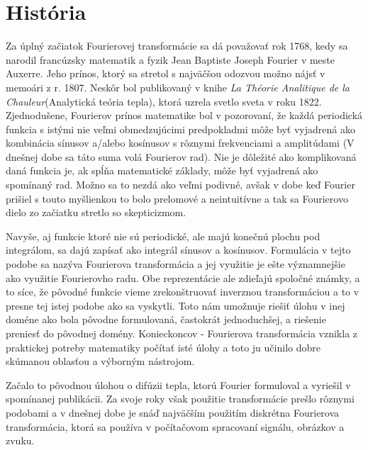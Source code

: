 \section{História}
Za úplný začiatok Fourierovej transformácie sa dá považovať rok 1768,
kedy sa narodil francúzsky matematik a fyzik Jean Baptiste Joseph
Fourier v meste Auxerre. Jeho prínos, ktorý sa stretol s najväčšou
odozvou možno nájsť v memoári z r. 1807. Neskôr bol publikovaný v
knihe \emph{La Théorie Analitique de la Chauleur}(Analytická teória
tepla), ktorá uzrela svetlo sveta v roku 1822.
Zjednodušene, Fourierov prínos matematike bol v pozorovaní, že každá
periodická funkcia s istými nie veľmi obmedzujúcimi predpokladmi
môže byť vyjadrená ako kombinácia sínusov a/alebo kosínusov s rôznymi
frekvenciami a amplitúdami (V dnešnej dobe sa táto suma volá Fourierov
rad). Nie je dôležité ako komplikovaná daná funkcia je, ak spĺňa
matematické základy, môže byť vyjadrená ako spomínaný rad. Možno sa to
nezdá ako veľmi podivné, avšak v dobe keď Fourier prišiel s touto
myšlienkou to bolo prelomové a neintuitívne a tak sa Fourierovo dielo
zo začiatku stretlo so skepticizmom.

Navyše, aj funkcie ktoré nie sú periodické, ale majú konečnú plochu
pod integrálom, sa dajú zapísať ako integrál sínusov a kosínusov.
Formulácia v tejto podobe sa nazýva Fourierova transformácia a jej
využitie je ešte významnejšie ako využitie Fourierovho radu. Obe
reprezentácie ale zdieľajú spoločné známky, a to síce, že pôvodné
funkcie vieme zrekonštruovať inverznou transformáciou a to v presne
tej istej podobe ako sa vyskytli. Toto nám umožnuje riešiť úlohu v
inej doméne ako bola pôvodne formulovaná, častokrát jednoduchšej, a
riešenie preniesť do pôvodnej domény. Konieckoncov - Fourierova
transformácia vznikla z praktickej potreby matematiky počítať isté
úlohy a toto ju učinilo dobre skúmanou oblasťou a výborným nástrojom.

Začalo to pôvodnou úlohou o difúzii tepla, ktorú Fourier formuloval a
vyriešil v spomínanej publikácii. Za svoje roky však použitie
transformácie prešlo rôznymi podobami a v dnešnej dobe je snáď
najväčším použitím diskrétna Fourierova transformácia, ktorá sa
používa v počítačovom spracovaní signálu, obrázkov a zvuku.
